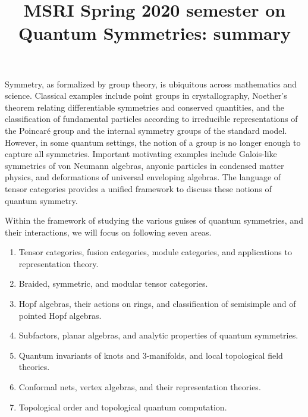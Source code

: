 \documentclass[12pt]{article}
\title{MSRI Spring 2020 semester on \textbf{Quantum Symmetries}: summary}
\begin{document}
\maketitle



Symmetry, as formalized by group theory, is ubiquitous across mathematics and science. Classical examples include point groups in crystallography, Noether's theorem relating differentiable symmetries and conserved quantities, and the classification of fundamental particles according to irreducible representations of the Poincar\'e group and the internal symmetry groups of the standard model. However, in some quantum settings, the notion of a group is no longer enough to capture all symmetries.  Important motivating examples include Galois-like symmetries of von Neumann algebras, anyonic particles in condensed matter physics, and deformations of universal enveloping algebras. The language of tensor categories provides a unified framework to discuss these notions of quantum symmetry.

Within the framework of studying the various guises of quantum symmetries, and their interactions, we will focus on following seven areas.
\begin{enumerate}
  \setlength{\itemsep}{1pt}
  \setlength{\parskip}{0pt}
  \setlength{\parsep}{0pt}
\item Tensor categories, fusion categories, module categories, and applications to representation theory.
\item Braided, symmetric, and modular tensor categories.
\item Hopf algebras, their actions on rings, and classification of semisimple and of pointed Hopf algebras.
\item Subfactors, planar algebras, and analytic properties of quantum symmetries.
\item Quantum invariants of knots and 3-manifolds, and local topological field theories.
\item Conformal nets, vertex algebras, and their representation theories.
\item Topological order and topological quantum computation.
\end{enumerate}


\newcommand{\drawI}{ \begin{tikzpicture}[baseline=0cm]
 	\draw (0,.2) .. controls +(30:.3cm) .. (45:.8cm);
 	\draw (0,.2) .. controls +(150:.3cm) .. (135:.8cm);
	\draw (0,.2) -- (0,-.2);
 	\draw (0,-.2) .. controls +(-30:.3cm) .. (-45:.8cm);
 	\draw (0,-.2) .. controls +(-150:.3cm) .. (-135:.8cm);
\end{tikzpicture}
}
\end{document}
